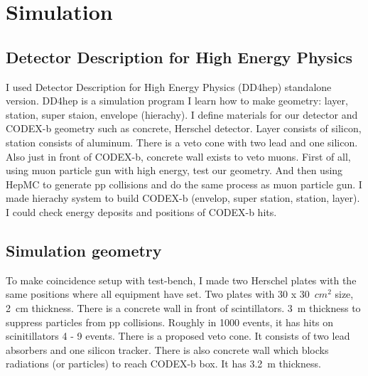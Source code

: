 \section{Simulation}
\label{sec:Simulation}

\subsection{Detector Description for High Energy Physics}
I used Detector Description for High Energy Physics (DD4hep) standalone version.
DD4hep is a simulation program 
I learn how to make geometry: layer, station, super staion, envelope (hierachy).
I define materials for our detector and CODEX-b geometry such as concrete, Herschel detector.
Layer consists of silicon, station consists of aluminum. 
There is a veto cone with two lead and one silicon. 
Also just in front of CODEX-b, concrete wall exists to veto muons.
First of all, using muon particle gun with high energy, test our geometry.
And then using HepMC to generate pp collisions and do the same process as muon particle gun.
I made hierachy system to build CODEX-b (envelop, super station, station, layer).
I could check energy deposits and positions of CODEX-b hits.


\subsection{Simulation geometry}
To make coincidence setup with test-bench, I made two Herschel plates with the same positions where all equipment have set.
Two plates with 30 x 30~$cm^{2}$ size, 2~cm thickness.
There is a concrete wall in front of scintillators.
3~m thickness to suppress particles from pp collisions.
Roughly in 1000 events, it has hits on scinitillators 4 - 9 events.
There is a proposed veto cone. It consists of two lead absorbers and one silicon tracker.
There is also concrete wall which blocks radiations (or particles) to reach CODEX-b box. 
It has 3.2~m thickness.


